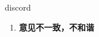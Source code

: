 
\begin{frame}
{\huge discord}
\begin{center}
\begin{enumerate}\Large
  \item \textbf{意见不一致，不和谐}
\end{enumerate}
\end{center}
\end{frame}
